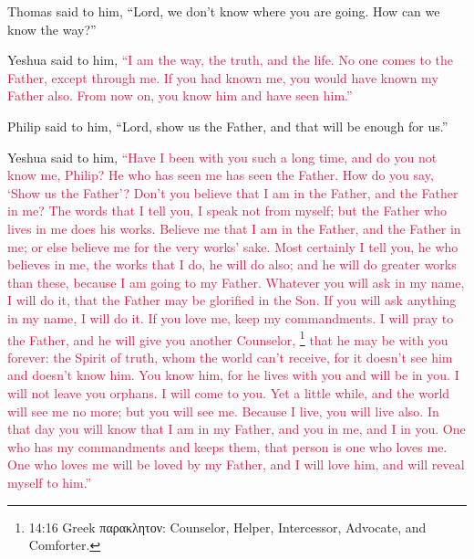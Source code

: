 \myverse{}Thomas said to him, “Lord, we don’t know where you are going.
How can we know the way?”

\myverse{}Yeshua said to him,
\textcolor{crimson}{“I am the way, the truth, and the life. No one comes to the Father, except through me.
}
\myverse{}\textcolor{crimson}{If you had known me, you would have known my Father also. From now on,
	you know him and have seen him.”}

\myverse{}Philip said to him, “Lord, show us the Father, and that will be
enough for us.”

\myverse{}Yeshua said to him,
\textcolor{crimson}{“Have I been with you such a long time, and do you not know me, Philip? He who has seen me has seen
	the Father. How do you say, ‘Show us the Father’?
}
\myverse{}\textcolor{crimson}{Don’t you believe that I am in the Father, and the Father in me? The
	words that I tell you, I speak not from myself; but the Father who lives in me does his works.
}
\myverse{}\textcolor{crimson}{Believe me that I am in the Father, and the Father in me; or else believe
	me for the very works’ sake.
}
\myverse{}\textcolor{crimson}{Most certainly I tell you, he who believes in me, the works that I do,
	he will do also; and he will do greater works than these, because I am going to my Father.
}
\myverse{}\textcolor{crimson}{Whatever you will ask in my name, I will do it, that the Father may be
	glorified in the Son.
}
\myverse{}\textcolor{crimson}{If you will ask anything in my name, I will do it.
}
\myverse{}\textcolor{crimson}{If you love me, keep my commandments.
}
\myverse{}\textcolor{crimson}{I will pray to the Father, and he will give you another Counselor,
}\footnote{14:16 Greek παρακλητον: Counselor, Helper, Intercessor, Advocate, and Comforter.}
\textcolor{crimson}{that he may be with you forever:}
\myverse{}\textcolor{crimson}{the Spirit of truth, whom the world can’t receive, for it doesn’t see
	him and doesn’t know him. You know him, for he lives with you and will be in you.
}
\myverse{}\textcolor{crimson}{I will not leave you orphans. I will come to you.
}
\myverse{}\textcolor{crimson}{Yet a little while, and the world will see me no more; but you will see
	me. Because I live, you will live also.
}
\myverse{}\textcolor{crimson}{In that day you will know that I am in my Father, and you in me, and
	I in you.
}
\myverse{}\textcolor{crimson}{One who has my commandments and keeps them, that person is one who loves
	me. One who loves me will be loved by my Father, and I will love him, and will reveal myself to him.”}

